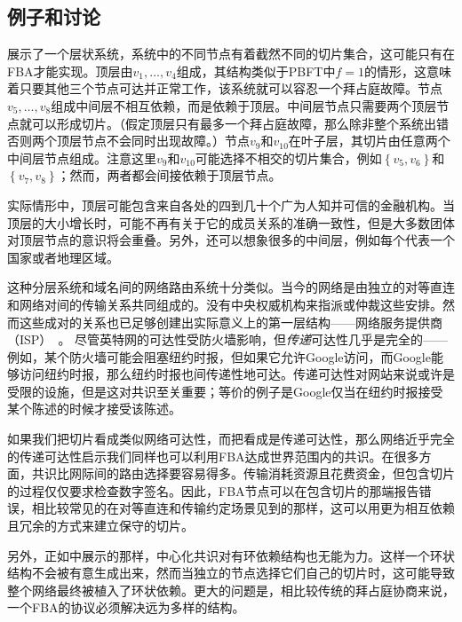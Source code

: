 \subsection{例子和讨论}
展示了一个层状系统，系统中的不同节点有着截然不同的切片集合，这可能只有在FBA才能实现。顶层由$v_1,\ldots,v_4$组成，其结构类似于PBFT中$f=1$的情形，这意味着只要其他三个节点可达并正常工作，该系统就可以容忍一个拜占庭故障。节点$v_5,\ldots,v_8$组成中间层不相互依赖，而是依赖于顶层。中间层节点只需要两个顶层节点就可以形成切片。（假定顶层只有最多一个拜占庭故障，那么除非整个系统出错否则两个顶层节点不会同时出现故障。）节点$v_9$和$v_{10}$在叶子层，其切片由任意两个中间层节点组成。注意这里$v_9$和$v_{10}$可能选择不相交的切片集合，例如$\left\{v_5,v_6\right\}$和$\left\{v_7,v_8\right\}$；然而，两者都会间接依赖于顶层节点。

实际情形中，顶层可能包含来自各处的四到几十个广为人知并可信的金融机构。当顶层的大小增长时，可能不再有关于它的成员关系的准确一致性，但是大多数团体对顶层节点的意识将会重叠。另外，还可以想象很多的中间层，例如每个代表一个国家或者地理区域。

这种分层系统和域名间的网络路由系统十分类似。当今的网络是由独立的对等直连和网络对间的传输关系共同组成的。没有中央权威机构来指派或仲裁这些安排。然而这些成对的关系也已足够创建出实际意义上的第一层结构——网络服务提供商（ISP）~\cite{peer_isp2010}。	尽管英特网的可达性受防火墙影响，但\textit{传递}可达性几乎是完全的——例如，某个防火墙可能会阻塞纽约时报，但如果它允许Google访问，而Google能够访问纽约时报，那么纽约时报也间传递性地可达。传递可达性对网站来说或许是受限的设施，但是这对共识至关重要；等价的例子是Google仅当在纽约时报接受某个陈述的时候才接受该陈述。

如果我们把{\quorum}切片看成类似网络可达性，而把{\quorum}看成是传递可达性，那么网络近乎完全的传递可达性启示我们同样也可以利用FBA达成世界范围内的共识。在很多方面，共识比网际间的路由选择要容易得多。传输消耗资源且花费资金，但包含切片的过程仅仅要求检查数字签名。因此，FBA节点可以在包含切片的那端报告错误，相比较常见的在对等直连和传输约定场景见到的那样，这可以用更为相互依赖且冗余的方式来建立保守的切片。

另外，正如中展示的那样，中心化共识对有环依赖结构也无能为力。这样一个环状结构不会被有意生成出来，然而当独立的节点选择它们自己的切片时，这可能导致整个网络最终被植入了环状依赖。更大的问题是，相比较传统的拜占庭协商来说，一个FBA的协议必须解决远为多样的{\quorum}结构。